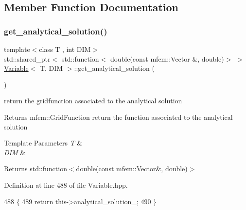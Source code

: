 \subsection{Member Function Documentation}
\mbox{\label{classVariable_acc06b9dfda611f1ad3b1c6d6b4386050}} 
\subsubsection{\texorpdfstring{get\+\_\+analytical\+\_\+solution()}{get\_analytical\_solution()}}
{\footnotesize\ttfamily template$<$class T , int D\+IM$>$ \\
std\+::shared\+\_\+ptr$<$ std\+::function$<$ double(const mfem\+::\+Vector \&, double)$>$ $>$ \hyperlink{classVariable}{Variable}$<$ T, D\+IM $>$\+::get\+\_\+analytical\+\_\+solution (\begin{DoxyParamCaption}{ }\end{DoxyParamCaption})}



return the gridfunction associated to the analytical solution 

\begin{DoxyReturn}{Returns}
mfem\+::\+Grid\+Function return the function associated to the analytical solution
\end{DoxyReturn}

\begin{DoxyTemplParams}{Template Parameters}
{\em T} & \\
\hline
{\em D\+IM} & \\
\hline
\end{DoxyTemplParams}
\begin{DoxyReturn}{Returns}
std\+::function$<$double(const mfem\+::\+Vector\&, double)$>$ 
\end{DoxyReturn}


Definition at line 488 of file Variable.\+hpp.


\begin{DoxyCode}
488                                           \{
489   \textcolor{keywordflow}{return} this->analytical\_solution\_;
490 \}
\end{DoxyCode}
\mbox{\label{classVariable_ab85faebdc51081412859462f7e44a1e2}} 
